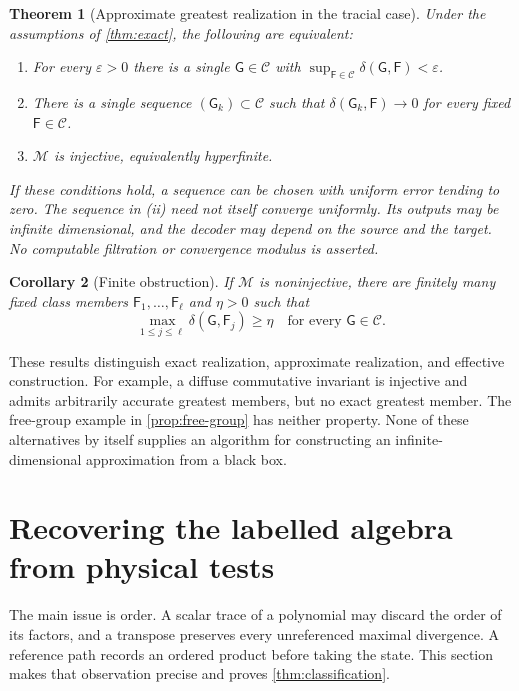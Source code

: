 \documentclass[11pt,reqno]{amsart}
\newtheorem{theorem}{Theorem}[section]
\newtheorem{corollary}[theorem]{Corollary}
\theoremstyle{definition}
\theoremstyle{remark}
\numberwithin{equation}{section}
\newcommand{\M}{\mathcal M}
\newcommand{\C}{\mathcal C}
\newcommand{\F}{\mathsf F}
\newcommand{\G}{\mathsf G}
\newcommand{\defic}{\delta}
\begin{document}
\begin{theorem}[Approximate greatest realization in the tracial case]\label{thm:approximate}
Under the assumptions of \cref{thm:exact}, the following are equivalent:
\begin{enumerate}
 \item For every $\varepsilon>0$ there is a single $\G\in\C$ with
 $\sup_{\F\in\C}\defic(\G,\F)<\varepsilon$.
 \item There is a single sequence $(\G_k)\subset\C$ such that
 $\defic(\G_k,\F)\to0$ for every fixed $\F\in\C$.
 \item $\M$ is injective, equivalently hyperfinite.
\end{enumerate}
If these conditions hold, a sequence can be chosen with uniform error tending to zero. The sequence in \textup{(ii)} need not itself converge uniformly. Its outputs may be infinite dimensional, and the decoder may depend on the source and the target. No computable filtration or convergence modulus is asserted.
\end{theorem}

\begin{corollary}[Finite obstruction]\label{cor:finite-obstruction}
If $\M$ is noninjective, there are finitely many fixed class members $\F_1,\ldots,\F_\ell$ and $\eta>0$ such that
\[
 \max_{1\le j\le\ell}\defic(\G,\F_j)\ge\eta
 \quad\text{for every }\G\in\C.
\]
\end{corollary}

These results distinguish exact realization, approximate realization, and effective construction. For example, a diffuse commutative invariant is injective and admits arbitrarily accurate greatest members, but no exact greatest member. The free-group example in \cref{prop:free-group} has neither property. None of these alternatives by itself supplies an algorithm for constructing an infinite-dimensional approximation from a black box.



\section{Recovering the labelled algebra from physical tests}\label{sec:profile}

The main issue is order. A scalar trace of a polynomial may discard the order of its factors, and a transpose preserves every unreferenced maximal divergence. A reference path records an ordered product before taking the state. This section makes that observation precise and proves \cref{thm:classification}.
\end{document}
